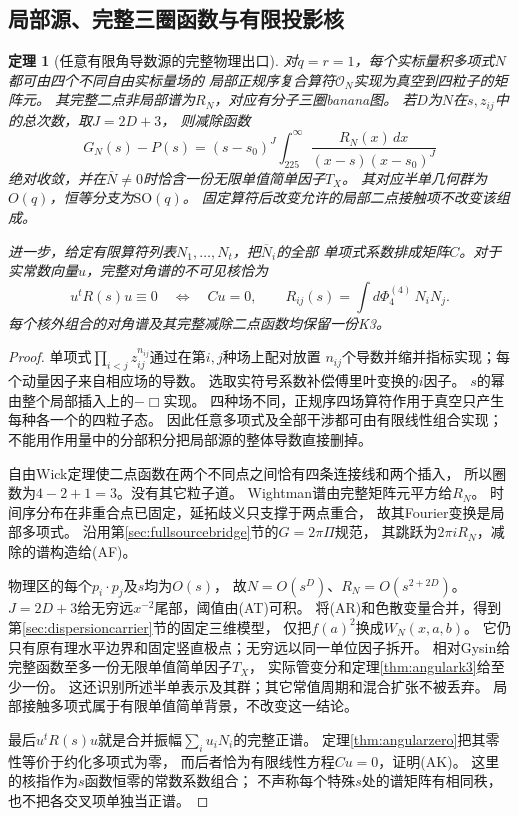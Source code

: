 \documentclass[11pt,a4paper]{ctexart}
\theoremstyle{cnplain}\newtheorem{theorem}{定理}[section]
\theoremstyle{definition}\newtheorem{definition}[theorem]{定义}
\theoremstyle{remark}\newtheorem{remark}[theorem]{注}
\begin{document}
\subsection{局部源、完整三圈函数与有限投影核}
\begin{theorem}[任意有限角导数源的完整物理出口]\label{thm:angularsource}
对$q=r=1$，每个实标量积多项式$N$都可由四个不同自由实标量场的
局部正规序复合算符$\mathcal O_N$实现为真空到四粒子的矩阵元。
其完整二点非局部谱为$R_N$，对应有分子三圈banana图。
若$D$为$N$在$s,z_{ij}$中的总次数，取$J=2D+3$，
则减除函数
\[
 G_N(s)-P(s)=(s-s_0)^J\int_{225}^{\infty}
       \frac{R_N(x)\,dx}{(x-s)(x-s_0)^J}
 \tag{AF}\label{eq:angularfull}
\]
绝对收敛，并在$\overline N\ne0$时恰含一份无限单值简单因子$T_X$。
其对应半单几何群为$O(q)$，恒等分支为$\mathrm{SO}(q)$。
固定算符后改变允许的局部二点接触项不改变该组成。

进一步，给定有限算符列表$N_1,\ldots,N_t$，把$\overline N_i$的全部
单项式系数排成矩阵$C$。对于实常数向量$u$，完整对角谱的不可见核恰为
\[
 u^t R(s)u\equiv0
 \quad\Longleftrightarrow\quad Cu=0,\qquad
 R_{ij}(s)=\int d\Phi_4^{(4)}\,N_iN_j.
 \tag{AK}\label{eq:angularkernel}
\]
每个核外组合的对角谱及其完整减除二点函数均保留一份K3。
\end{theorem}
\begin{proof}
单项式$\prod_{i<j}z_{ij}^{n_{ij}}$通过在第$i,j$种场上配对放置
$n_{ij}$个导数并缩并指标实现；每个动量因子来自相应场的导数。
选取实符号系数补偿傅里叶变换的$i$因子。
$s$的幂由整个局部插入上的$-\Box$实现。
四种场不同，正规序四场算符作用于真空只产生每种各一个的四粒子态。
因此任意多项式及全部干涉都可由有限线性组合实现；
不能用作用量中的分部积分把局部源的整体导数直接删掉。

自由Wick定理使二点函数在两个不同点之间恰有四条连接线和两个插入，
所以圈数为$4-2+1=3$。没有其它粒子道。
Wightman谱由完整矩阵元平方给$R_N$。
时间序分布在非重合点已固定，延拓歧义只支撑于两点重合，
故其Fourier变换是局部多项式。
沿用第\ref{sec:fullsourcebridge}节的$G=2\pi\Pi$规范，
其跳跃为$2\pi iR_N$，减除的谱构造给(AF)。

物理区的每个$p_i\cdot p_j$及$s$均为$O(s)$，
故$N=O(s^D)$、$R_N=O(s^{2+2D})$。
$J=2D+3$给无穷远$x^{-2}$尾部，阈值由(AT)可积。
将(AR)和色散变量合并，得到第\ref{sec:dispersioncarrier}节的固定三维模型，
仅把$f(a)^2$换成$W_N(x,a,b)$。
它仍只有原有理水平边界和固定竖直极点；无穷远以同一单位因子拆开。
相对Gysin给完整函数至多一份无限单值简单因子$T_X$，
实际管变分和定理\ref{thm:angulark3}给至少一份。
这还识别所述半单表示及其群；其它常值周期和混合扩张不被丢弃。
局部接触多项式属于有限单值简单背景，不改变这一结论。

最后$u^tR(s)u$就是合并振幅$\sum_i u_iN_i$的完整正谱。
定理\ref{thm:angularzero}把其零性等价于约化多项式为零，
而后者恰为有限线性方程$Cu=0$，证明(AK)。
这里的核指作为$s$函数恒零的常数系数组合；
不声称每个特殊$s$处的谱矩阵有相同秩，也不把各交叉项单独当正谱。
\end{proof}
\end{document}
